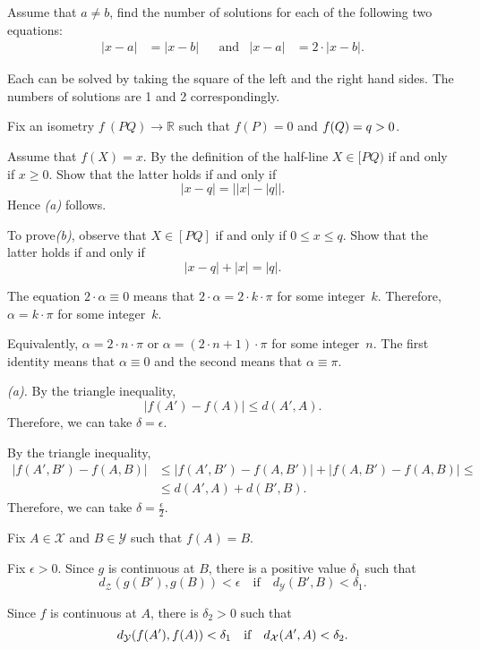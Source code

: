 Assume that $a\ne b$,
find the number of solutions for each of the following two equations:
\begin{align*}
|x-a|&=|x-b|
&&\text{and}
&|x-a|&=2\cdot |x-b|.
\end{align*}

Each can be solved by taking the square of the left and the right hand sides.
The numbers of solutions are 1 and 2 correspondingly.

Fix an isometry $f\:(P Q)\to \mathbb{R}$ such that $f(P)=0$ and $f(Q)\z=q>0$.

Assume that $f(X)=x$.
By the definition of the half-line $X\in[PQ)$ if and only if $x\ge 0$.
Show that the latter holds if and only if 
\[|x-q|=\bigl||x|-|q|\bigr|.\]
Hence \textit{(a)} follows.

To prove\textit{(b)}, observe that $X\in [PQ]$ if and only if $0\le x\le q$.
Show that the latter holds if and only if 
\[|x-q|+|x|=|q|.\]

The equation
$2\cdot\alpha\equiv 0$
means that $2\cdot\alpha=2\cdot k\cdot\pi$ for some integer~$k$.
Therefore,
$\alpha=k\cdot\pi$ for some integer~$k$.

Equivalently, $\alpha=2\cdot n\cdot \pi$ or $\alpha=(2\cdot n+1)\cdot \pi$ for some integer~$n$.
The first identity means that $\alpha\equiv 0$ and the second means that $\alpha\equiv \pi$.

 \textit{(a).}
By the triangle inequality,
$$|f(A')-f(A)|\le d(A',A).$$
Therefore, we can take $\delta=\epsilon$.

By the triangle inequality,
\begin{align*}
|f(A',B')-f(A,B)|
&\le |f(A',B')-f(A,B')|
+|f(A,B')-f(A,B)|
\le
\\
&\le d(A',A)+d(B',B).
\end{align*}
Therefore, we can take $\delta=\tfrac\epsilon2$.

Fix $A\in \mathcal{X}$ and $B\in\mathcal{Y}$
such that $f(A)=B$.

Fix $\epsilon>0$.
Since $g$ is continuous at $B$, there is a positive value $\delta_1$ such that 
$$d_{\mathcal{Z}}(g(B'),g(B))<\epsilon
\quad
\text{if}
\quad
d_{\mathcal{Y}}(B',B)<\delta_1.$$ 

Since $f$ is continuous at $A$, there is $\delta_2>0$ such that 
$$d_{\mathcal{Y}}(f(A'),f(A))\z<\delta_1
\quad
\text{if}
\quad
d_{\mathcal{X}}(A',A)<\delta_2.$$ 

